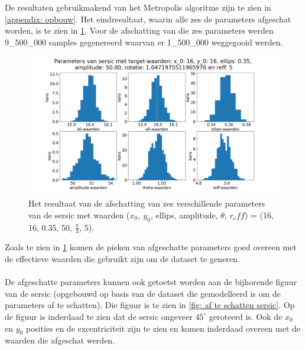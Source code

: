 De resultaten gebruikmakend van het Metropolis algoritme zijn te zien in \cref{appendix: opbouw}. Het eindresultaat, waarin alle zes de parameters afgeschat worden, is te zien in \cref{fig: 6 onbekenden}. Voor de afschatting van die zes parameters werden 9\_500\_000 samples gegenereerd waarvan er 1\_500\_000 weggegooid werden.
\begin{figure}
    \centering
    \includegraphics[width=0.95\linewidth]{Figures/sersic_parameters_metropolis_9500000_1500000_50_reff.png}
    \caption{Het resultaat van de afschatting van zes verschillende parameters van de sersic met waarden ($x_0,\ y_0$, ellips, amplitude, $\theta$, $r_eff$) = (16, 16, 0.35, 50, $\frac{\pi}{3}$,  5).}
    \label{fig: 6 onbekenden}
\end{figure}
Zoals te zien in \cref{fig: 6 onbekenden} komen de pieken van afgeschatte parameters goed overeen met de effectieve waarden die gebruikt zijn om de dataset te generen. \\ \\De afgeschatte parameters kunnen ook getoetst worden aan de bijhorende figuur van de sersic (opgebouwd op basis van de dataset die gemodelleerd is om de parameters af te schatten). Die figuur is te zien in \cref{fig: af te schatten sersic}. Op de figuur is inderdaad te zien dat de sersic ongeveer $45^{\circ}$ geroteerd is. Ook de $x_0$ en $y_0$ posities en de excentriciteit zijn te zien en komen inderdaad overeen met de waarden die afgeschat werden. 
